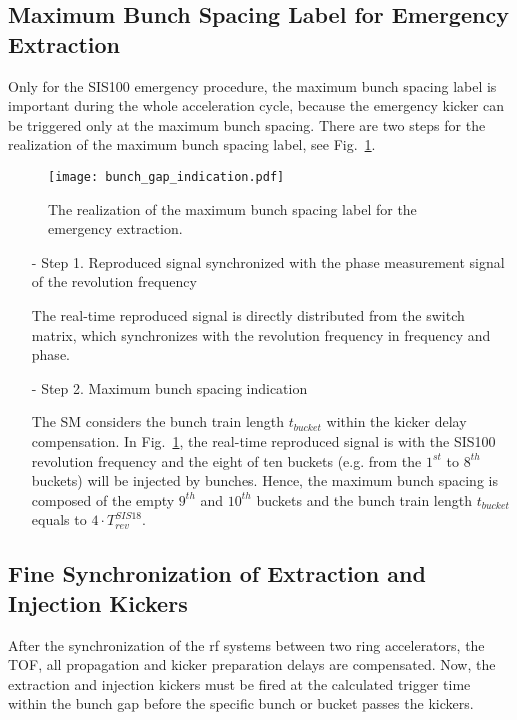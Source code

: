 \subsection{Maximum Bunch Spacing Label for Emergency Extraction}

Only for the SIS100 emergency procedure, the maximum bunch spacing label is important during the whole acceleration cycle, because the emergency kicker can be triggered only at the maximum bunch spacing. There are two steps for the realization of the maximum bunch spacing label, see Fig.~\ref{Emergency_label}.
\begin{figure}[!htb]
   \centering   
   \texttt{[image: bunch\_gap\_indication.pdf]}
   \caption{The realization of the maximum bunch spacing label for the emergency extraction.}
   \label{Emergency_label}
\end{figure} 

\begin{itemize}
\item[-] Step 1. Reproduced signal synchronized with the phase measurement signal of the revolution frequency

The real-time reproduced signal is directly distributed from the switch matrix, which synchronizes with the revolution frequency in frequency and phase.
\item[-] Step 2. Maximum bunch spacing indication

The SM considers the bunch train length $t_{\mathit{bucket}}$ within the kicker delay compensation. In Fig.~\ref{Emergency_label}, the real-time reproduced signal is with the SIS100 revolution frequency and the eight of ten buckets (e.g. from the $1^{st}$ to $8^{th}$ buckets) will be injected by bunches. Hence, the maximum bunch spacing is composed of the empty $9^{th}$ and $10^{th}$ buckets and the bunch train length $t_{\mathit{bucket}}$ equals to $4\cdot T_{\mathit{rev}}^{\mathit{SIS18}}$.

\end{itemize}



\subsection{Fine Synchronization of Extraction and Injection Kickers}
After the synchronization of the rf systems between two ring accelerators, the TOF, all propagation and kicker preparation delays are compensated. Now, the extraction and injection kickers must be fired at the calculated trigger time within the bunch gap before the specific bunch or bucket passes the kickers.
 
